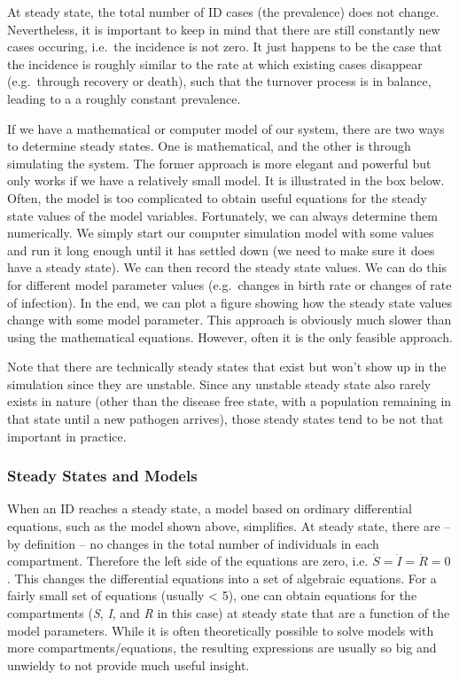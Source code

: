 \documentclass[]{book}
\theoremstyle{definition}
\theoremstyle{definition}
\theoremstyle{definition}
\theoremstyle{remark}
\begin{document}
At steady state, the total number of ID cases (the prevalence) does not
change. Nevertheless, it is important to keep in mind that there are
still constantly new cases occuring, i.e.~the incidence is not zero. It
just happens to be the case that the incidence is roughly similar to the
rate at which existing cases disappear (e.g.~through recovery or death),
such that the turnover process is in balance, leading to a a roughly
constant prevalence.

If we have a mathematical or computer model of our system, there are two
ways to determine steady states. One is mathematical, and the other is
through simulating the system. The former approach is more elegant and
powerful but only works if we have a relatively small model. It is
illustrated in the box below. Often, the model is too complicated to
obtain useful equations for the steady state values of the model
variables. Fortunately, we can always determine them numerically. We
simply start our computer simulation model with some values and run it
long enough until it has settled down (we need to make sure it does have
a steady state). We can then record the steady state values. We can do
this for different model parameter values (e.g.~changes in birth rate or
changes of rate of infection). In the end, we can plot a figure showing
how the steady state values change with some model parameter. This
approach is obviously much slower than using the mathematical equations.
However, often it is the only feasible approach.

Note that there are technically steady states that exist but won't show
up in the simulation since they are unstable. Since any unstable steady
state also rarely exists in nature (other than the disease free state,
with a population remaining in that state until a new pathogen arrives),
those steady states tend to be not that important in practice.

\subsubsection{Steady States and Models}\label{myadvancedbox}

When an ID reaches a steady state, a model based on ordinary
differential equations, such as the model shown above, simplifies. At
steady state, there are -- by definition -- no changes in the total
number of individuals in each compartment. Therefore the left side of
the equations are zero, i.e. \(\dot S = \dot I = \dot R =0\). This
changes the differential equations into a set of algebraic equations.
For a fairly small set of equations (usually \textless{} 5), one can
obtain equations for the compartments (\emph{S}, \emph{I}, and \emph{R}
in this case) at steady state that are a function of the model
parameters. While it is often theoretically possible to solve models
with more compartments/equations, the resulting expressions are usually
so big and unwieldy to not provide much useful insight.
\end{document}
